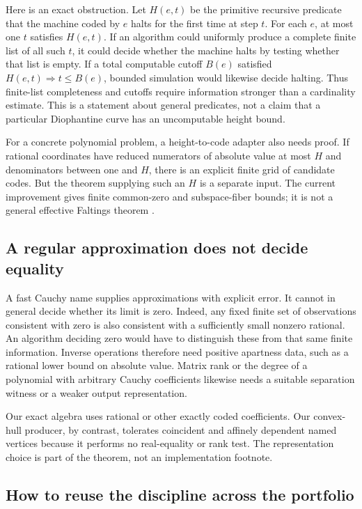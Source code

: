 Here is an exact obstruction. Let $H(e,t)$ be the primitive recursive predicate that the machine coded by $e$ halts for the first time at step $t$. For each $e$, at most one $t$ satisfies $H(e,t)$. If an algorithm could uniformly produce a complete finite list of all such $t$, it could decide whether the machine halts by testing whether that list is empty. If a total computable cutoff $B(e)$ satisfied $H(e,t)\Rightarrow t\le B(e)$, bounded simulation would likewise decide halting. Thus finite-list completeness and cutoffs require information stronger than a cardinality estimate. This is a statement about general predicates, not a claim that a particular Diophantine curve has an uncomputable height bound.

For a concrete polynomial problem, a height-to-code adapter also needs proof. If rational coordinates have reduced numerators of absolute value at most $H$ and denominators between one and $H$, there is an explicit finite grid of candidate codes. But the theorem supplying such an $H$ is a separate input. The current improvement gives finite common-zero and subspace-fiber bounds; it is not a general effective Faltings theorem \cite{repo-faltings}.

\subsection{A regular approximation does not decide equality}

A fast Cauchy name supplies approximations with explicit error. It cannot in general decide whether its limit is zero. Indeed, any fixed finite set of observations consistent with zero is also consistent with a sufficiently small nonzero rational. An algorithm deciding zero would have to distinguish these from that same finite information. Inverse operations therefore need positive apartness data, such as a rational lower bound on absolute value. Matrix rank or the degree of a polynomial with arbitrary Cauchy coefficients likewise needs a suitable separation witness or a weaker output representation.

Our exact algebra uses rational or other exactly coded coefficients. Our convex-hull producer, by contrast, tolerates coincident and affinely dependent named vertices because it performs no real-equality or rank test. The representation choice is part of the theorem, not an implementation footnote.

\subsection{How to reuse the discipline across the portfolio}

